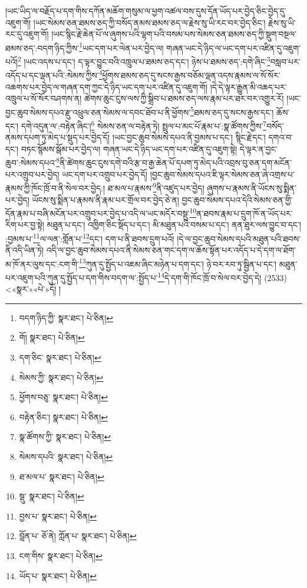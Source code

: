 །ཡང་ཡིད་ལ་བརྗོད་པ་དག་གིས་དཀོན་མཆོག་གསུམ་ལ་ཕྱག་འཚལ་བས་དུས་དོན་ཡོད་པར་བྱེད་ཅིང་བྱེད་དུ་འཇུག་གོ། །ཡང་སེམས་ཅན་ཐམས་ཅད་ཀྱི་བསོད་ནམས་ཐམས་ཅད་ལ་རྗེས་སུ་ཡི་རང་བར་བྱེད་ཅིང་། རྗེས་སུ་ཡི་རང་དུ་འཇུག་གོ། །ཡང་སྙིང་རྗེ་ཆེན་པོ་ལ་ཞུགས་པའི་ལྷག་པའི་བསམ་པས་སེམས་ཅན་ཐམས་ཅད་ཀྱི་སྡུག་བསྔལ་ཐམས་ཅད་:བདག་ཉིད་ཀྱིས་\footnote{བདག་ཉིད་ཀྱི་  སྣར་ཐང་།  པེ་ཅིན། }ཡང་དག་པར་ལེན་པར་བྱེད་ལ། གཞན་ཡང་དེ་ཉིད་ལ་ཡང་དག་པར་འཛིན་དུ་འཇུག་པའོ།\footnote{གོ།  སྣར་ཐང་།  པེ་ཅིན། } །ཡང་འདས་པ་དང་། ད་ལྟར་བྱུང་བའི་འཁྲུལ་པ་ཐམས་ཅད་དང་། ཉེས་པ་ཐམས་ཅད་:དགེ་ཞིང་\footnote{དག་ཅིང་  སྣར་ཐང་།  པེ་ཅིན། }བསླབ་པར་འདོད་པ་དང་ལྡན་པའི་:སེམས་ཀྱིས་\footnote{སེམས་ཀྱི་  སྣར་ཐང་།  པེ་ཅིན། }ཕྱོགས་ཐམས་ཅད་དུ་སངས་རྒྱས་བཅོམ་ལྡན་འདས་རྣམས་ལ་སོ་སོར་འཆགས་པར་བྱེད་ལ་གཞན་དག་ཀྱང་དེ་ཉིད་ཡང་དག་པར་འཛིན་དུ་འཇུག་གོ། །དེ་དེ་ལྟར་རྒྱུན་མི་འཆད་པར་འཁྲུལ་པ་སོ་སོར་བཤགས་ན། ཚེགས་ཆུང་ངུས་ལས་ཀྱི་སྒྲིབ་པ་ཐམས་ཅད་ལས་རྣམ་པར་ཐར་བར་འགྱུར་རོ། །ཡང་བྱང་ཆུབ་སེམས་དཔའ་རྫུ་འཕྲུལ་ཅན་སེམས་ལ་དབང་ཐོབ་པ་ནི་ཕྱོགས་\footnote{ཕྱོགས་བཅུ་  སྣར་ཐང་།  པེ་ཅིན། }ཐམས་ཅད་དུ་སངས་རྒྱས་དང་། ཆོས་དང་། དགེ་འདུན་ལ་:བརྟེན་ཞིང་།\footnote{བརྟེན་ཅིང་།  སྣར་ཐང་།  པེ་ཅིན། } སེམས་ཅན་ལ་བརྟེན་ཏེ། སྤྲུལ་པ་མང་པོ་རྣམ་པ་:སྣ་ཚོགས་ཀྱིས་\footnote{སྣ་ཚོགས་ཀྱི་  སྣར་ཐང་།  པེ་ཅིན། }བསོད་ནམས་དཔག་ཏུ་མེད་པ་སྡུད་པར་བྱེད་དོ། །ཡང་བྱང་ཆུབ་སེམས་དཔའ་ནི་བྱམས་པ་དང་། སྙིང་རྗེ་དང་། དགའ་བ་དང་། བཏང་སྙོམས་སྒོམ་པར་བྱེད་ལ། གཞན་ཡང་དེ་ཉིད་ཡང་དག་པར་འཛིན་དུ་འཇུག་སྟེ། དེ་ལྟར་ན་བྱང་ཆུབ་:སེམས་དཔའ་\footnote{སེམས་དཔའི་  སྣར་ཐང་།  པེ་ཅིན། }ནི་ཚེགས་ཆུང་ངུས་དགེ་བའི་རྩ་བ་རྒྱ་ཆེན་པོ་དཔག་ཏུ་མེད་པའི་འབྲས་བུ་ཅན་དག་མངོན་པར་འགྲུབ་པར་བྱེད། ཡང་དག་པར་འགྲུབ་པར་བྱེད་དོ། །བྱང་ཆུབ་སེམས་དཔའ་ཇི་ལྟར་སེམས་ཅན་ཞེ་འགྲས་པ་རྣམས་ཀྱི་ཁོང་ཁྲོ་བ་ནི་སེལ་བར་བྱེད:། ཐ་མལ་པ་རྣམས་\footnote{ཐ་མལ་པ་  སྣར་ཐང་།  པེ་ཅིན། }ནི་འཛུད་པར་བྱེད། ཞུགས་པ་རྣམས་ནི་ཡོངས་སུ་སྨིན་པར་བྱེད། ཡོངས་སུ་སྨིན་པ་རྣམས་ནི་རྣམ་པར་གྲོལ་བར་བྱེད་ཅེ་ན། བྱང་ཆུབ་སེམས་དཔའ་དེའི་སེམས་ཅན་གྱི་དོན་རྣམ་པ་བཞི་མངོན་པར་འགྲུབ་པར་བྱེད་པ་འདི་ལ་ཡང་མདོར་བསྡུ་\footnote{སྡུ་  སྣར་ཐང་།  པེ་ཅིན། }ན་ཐབས་རྣམ་པ་དྲུག་ཁོ་ན་ཡོད་པར་རིག་པར་བྱ་སྟེ། མཐུན་པ་དང་། འཁྱིག་ཅིང་སྡོད་པ་དང་། མི་མཐུན་པའི་བསམ་པ་དང་། ནན་ཐུར་ལས་བྱུང་བ་དང་། :བྱམས་པ་\footnote{བྱས་པ་  སྣར་ཐང་།  པེ་ཅིན། }ལ་ལན་:གློན་པ་\footnote{བློན་པ་  ཅོ་ནེ། ཀློན་པ་  སྣར་ཐང་།  པེ་ཅིན། }དང་། དག་པ་ནི་ཐབས་དྲུག་པའོ། །དེ་ལ་བྱང་ཆུབ་སེམས་དཔའི་མཐུན་པའི་ཐབས་ནི་འདི་ཡིན་ཏེ། འདི་ལ་བྱང་ཆུབ་སེམས་དཔའ་ནི་སེམས་ཅན་གང་དག་ལ་ཆོས་སྟོན་པར་འདོད་པ་དེ་དག་ལ་ཐོག་མ་ཁོ་ནར་ལུས་དང་:ངག་གི་\footnote{ངག་གིས་  སྣར་ཐང་།  པེ་ཅིན། }ཀུན་དུ་སྤྱོད་པ་འཇམ་ཞིང་མཉེན་པ་དག་དང་། ཉེ་བར་རབ་ཏུ་སྦྱིན་པ་དང་། མཐུན་པར་འཇུག་པའི་ཀུན་དུ་སྤྱོད་པ་དག་གིས་བདག་ལ་:སྤྱོད་པ་\footnote{ཡོད་པ་  སྣར་ཐང་།  པེ་ཅིན། }དེ་དག་གི་ཁོང་ཁྲོ་བ་སེལ་བར་བྱེད་དེ། (2533) <«སྣར་»«པེ་»དོ། །
